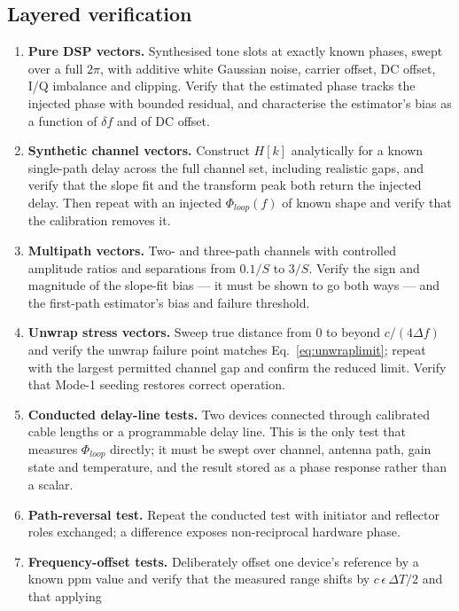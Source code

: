 \documentclass[11pt,a4paper]{article}
\begin{document}
\subsection{Layered verification}

\begin{enumerate}[leftmargin=1.7em,itemsep=2pt]
  \item \textbf{Pure DSP vectors.} Synthesised tone slots at exactly known phases, swept over a full
    $2\pi$, with additive white Gaussian noise, carrier offset, DC offset, I/Q imbalance and
    clipping. Verify that the estimated phase tracks the injected phase with bounded residual, and
    characterise the estimator's bias as a function of $\delta f$ and of DC offset.
  \item \textbf{Synthetic channel vectors.} Construct $H[k]$ analytically for a known single-path
    delay across the full channel set, including realistic gaps, and verify that the slope fit and
    the transform peak both return the injected delay. Then repeat with an injected
    $\Phi_{loop}(f)$ of known shape and verify that the calibration removes it.
  \item \textbf{Multipath vectors.} Two- and three-path channels with controlled amplitude ratios and
    separations from $0.1/S$ to $3/S$. Verify the sign and magnitude of the slope-fit bias --- it
    must be shown to go both ways --- and the first-path estimator's bias and failure threshold.
  \item \textbf{Unwrap stress vectors.} Sweep true distance from 0 to beyond $c/(4\Delta f)$ and
    verify the unwrap failure point matches Eq.~\eqref{eq:unwraplimit}; repeat with the largest
    permitted channel gap and confirm the reduced limit. Verify that Mode-1 seeding restores correct
    operation.
  \item \textbf{Conducted delay-line tests.} Two devices connected through calibrated cable lengths
    or a programmable delay line. This is the only test that measures $\Phi_{loop}$ directly; it must
    be swept over channel, antenna path, gain state and temperature, and the result stored as a
    phase response rather than a scalar.
  \item \textbf{Path-reversal test.} Repeat the conducted test with initiator and reflector roles
    exchanged; a difference exposes non-reciprocal hardware phase.
  \item \textbf{Frequency-offset tests.} Deliberately offset one device's reference by a known ppm
    value and verify that the measured range shifts by $c\,\epsilon\,\Delta T/2$ and that applying

\end{enumerate}
\end{document}
